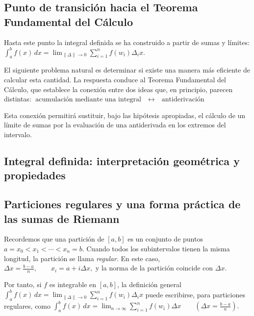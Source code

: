 \documentclass[12pt]{article}
\begin{document}
\subsection*{Punto de transición hacia el Teorema Fundamental del Cálculo}
Hasta este punto la integral definida se ha construido a partir de sumas y
límites:
$
\int_a^b f(x)\,dx
=
\lim_{\|\Delta\|\to0}
\sum_{i=1}^{n}f(w_i)\Delta_i x.
$

El siguiente problema natural es determinar si existe una manera más eficiente
de calcular esta cantidad. La respuesta conduce al Teorema Fundamental del
Cálculo, que establece la conexión entre dos ideas que, en principio, parecen
distintas:
$
\boxed{
\text{acumulación mediante una integral}
\quad\longleftrightarrow\quad
\text{antiderivación}
}
$

Esta conexión permitirá sustituir, bajo las hipótesis apropiadas, el cálculo de
un límite de sumas por la evaluación de una antiderivada en los extremos del
intervalo.

\subsection*{Integral definida: interpretación geométrica y propiedades}

\subsection*{Particiones regulares y una forma práctica de las sumas de Riemann}
Recordemos que una partición de $[a,b]$ es un conjunto de puntos
$
a=x_0<x_1<\cdots <x_n=b.
$
Cuando todos los subintervalos tienen la misma longitud, la partición se llama
\emph{regular}. En este caso,
$
\Delta x=\frac{b-a}{n},
\qquad
x_i=a+i\Delta x,
$
y la norma de la partición coincide con $\Delta x$.

Por tanto, si $f$ es integrable en $[a,b]$, la definición general
$
\int_a^b f(x)\,dx
=
\lim_{\|\Delta\|\to0}
\sum_{i=1}^n f(w_i)\Delta_i x
$
puede escribirse, para particiones regulares, como
$
\boxed{
\int_a^b f(x)\,dx
=
\lim_{n\to\infty}
\sum_{i=1}^n f(w_i)\Delta x
}
\qquad
\left(\Delta x=\frac{b-a}{n}\right).
$
\end{document}
